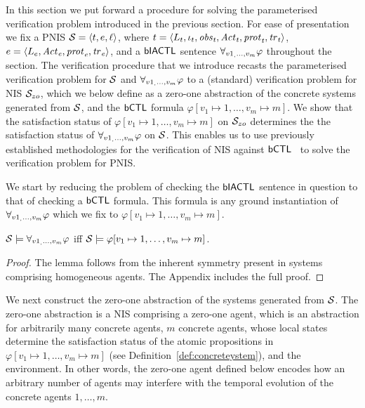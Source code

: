 In this section we put forward a procedure for solving the parameterised
verification problem introduced in the previous section. For ease of
presentation we fix a PNIS $\mathcal S = \left \langle t, e, \ell \right \rangle$, where ${t} =
\left \langle L_{t}, \iota_{t}, \it{obs}_{t}, \it{Act}_{t}, \it{prot}_{t}, \it{tr}_{t}  \right \rangle$, ${e} =
\left \langle L_{e}, \it{Act}_{e}, \it{prot}_{e}, \it{tr}_{e}  \right \rangle$, and a $\sf{bIACTL}$ sentence
$\forall_{v1_,\ldots,v_m} \varphi$ throughout the section. The verification procedure that we
introduce recasts the parameterised verification problem for $\mathcal S$ and
$\forall_{v1_,\ldots,v_m} \varphi$  to a (standard) verification problem for NIS $\mathcal S_{zo}$, which
we below define as a zero-one abstraction of the concrete systems generated from
$\mathcal S$,  and the $\sf{bCTL}$ formula $\varphi[v_1 \mapsto 1, \ldots, v_m \mapsto
m]$.  We show that the satisfaction status of $\varphi[v_1 \mapsto 1, \ldots,
v_m \mapsto m]$ on $\mathcal S_{zo}$ determines the the satisfaction status of
$\forall_{v1_,\ldots,v_m} \varphi$ on $\mathcal S$. This enables us to use previously established
methodologies for the verification of NIS against $\sf{bCTL}$~\cite{Akintunde+20b}
to solve the verification problem for PNIS.


We start by reducing the problem of checking the $\sf{bIACTL}$ sentence in question
to that of checking a $\sf{bCTL}$ formula. This formula is any ground instantiation
of $\forall_{v1_,\ldots,v_m} \varphi$ which we fix to $\varphi[v_1 \mapsto 1, \ldots, v_m \mapsto m]$.


\begin{lemma}
$\mathcal S \models \forall_{v1_,\ldots,v_m} \varphi$ iff $\mathcal S \models \varphi[v_1 \mapsto 1, \ldots, v_m
\mapsto m]$.
\end{lemma}
\begin{proof}
The lemma follows from the inherent symmetry present in systems comprising
homogeneous agents. The Appendix includes the full proof.
\end{proof}

We next construct the zero-one abstraction of the systems generated from
$\mathcal S$. The zero-one abstraction is a NIS comprising a zero-one agent, which is
an abstraction for arbitrarily many concrete agents, $m$ concrete agents, whose
local states determine the satisfaction status of the atomic propositions in
$\varphi[v_1 \mapsto 1, \ldots, v_m \mapsto m]$ (see
Definition~\ref{def:concreteystem}), and the environment. In other words, the
zero-one agent defined below encodes how an arbitrary number of agents may
interfere with the temporal evolution of the concrete agents $1, \ldots, m$.

